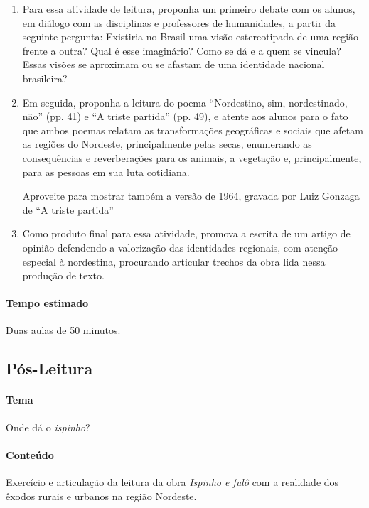 \documentclass[12pt]{extarticle}
\begin{document}
\begin{enumerate}
\item
Para essa atividade de leitura, proponha um primeiro debate com os alunos,
em diálogo com as disciplinas e professores de humanidades, a partir da 
seguinte pergunta: 
Existiria no Brasil uma visão estereotipada de uma região frente a outra? 
Qual é esse imaginário? Como se dá e a quem se vincula? Essas visões se 
aproximam ou se afastam de uma identidade nacional brasileira?

\item
Em seguida, proponha a leitura do poema ``Nordestino, sim, nordestinado, 
não'' (pp. 41) e ``A triste partida'' (pp. 49), e atente aos alunos para 
o fato que ambos poemas relatam as transformações geográficas e sociais 
que afetam as regiões do Nordeste, principalmente pelas secas, enumerando 
as consequências e reverberações para os animais, a vegetação e, 
principalmente, para as pessoas em sua luta cotidiana. 

Aproveite para mostrar também a versão de 1964, gravada por Luiz Gonzaga 
de \href{https://www.youtube.com/watch?v=Yu0bvuK8s_k&ab_channel=EllisStoffel}{``A triste partida''}

\item
Como produto final para essa atividade, promova a escrita de um artigo de 
opinião defendendo a valorização das identidades regionais, com atenção 
especial à nordestina, procurando articular trechos da obra lida nessa 
produção de texto. 

\end{enumerate}

\paragraph{Tempo estimado} Duas aulas de 50 minutos.  

\subsection{Pós-Leitura}

\paragraph{Tema} Onde dá o \textit{ispinho}?

\paragraph{Conteúdo} Exercício e articulação da leitura da obra 
\emph{Ispinho e fulô} com a realidade dos êxodos rurais e urbanos na 
região Nordeste.
\end{document}

